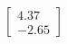 \documentclass[preview]{standalone}
\begin{document}
\begin{align*}
\begin{bmatrix} 4.37 \\ -2.65 \end{bmatrix}
\end{align*}
\end{document}
